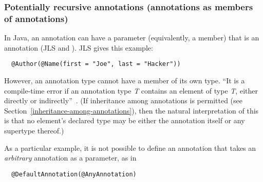\documentclass[10pt]{article}
\begin{document}




\subsubsection{Potentially recursive annotations (annotations as members of annotations)\label{annotations-as-members}\label{annotations-as-arguments}\label{recursive-annotations}}

In Java, an annotation can have a parameter (equivalently, a member) that is an
annotation (JLS
 and
).
JLS
gives this example:

\begin{Verbatim}
  @Author(@Name(first = "Joe", last = "Hacker"))
\end{Verbatim}

However, an annotation type cannot have a member of its own type.
``It is a compile-time error if an annotation type \emph{T} contains an
element of type \emph{T}, either directly or
indirectly''~\cite[\S9.6]{GoslingJSB2005}.
(If inheritance among annotations is permitted (see
Section~\ref{inheritance-among-annotations}), then the natural
interpretation of this is that no element's declared type may be either the
annotation itself or any supertype thereof.)

As a particular example, it is not possible to define an annotation that
takes an \emph{arbitrary} annotation as a parameter, as in

\begin{Verbatim}
  @DefaultAnnotation(@AnyAnnotation)
\end{Verbatim}
\end{document}
